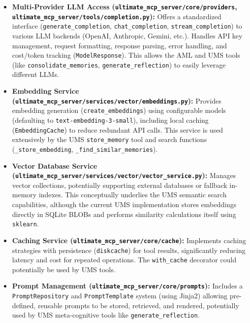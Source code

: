 \documentclass[12pt,a4paper]{article}
\newcommand{\code}[1]{\nolinkurl{#1}}
\begin{document}
\begin{itemize}
    \item \textbf{Multi-Provider LLM Access (\code{ultimate\_mcp\_server/core/providers}, \code{ultimate\_mcp\_server/tools/completion.py}):} Offers a standardized interface (\code{generate\_completion}, \code{chat\_completion}, \code{stream\_completion}) to various LLM backends (OpenAI, Anthropic, Gemini, etc.). Handles API key management, request formatting, response parsing, error handling, and cost/token tracking (\code{ModelResponse}). This allows the AML and UMS tools (like \code{consolidate\_memories}, \code{generate\_reflection}) to easily leverage different LLMs.

    \item \textbf{Embedding Service (\code{ultimate\_mcp\_server/services/vector/embeddings.py}):} Provides embedding generation (\code{create\_embeddings}) using configurable models (defaulting to \code{text-embedding-3-small}), including local caching (\code{EmbeddingCache}) to reduce redundant API calls. This service is used extensively by the UMS \code{store\_memory} tool and search functions (\code{\_store\_embedding}, \code{\_find\_similar\_memories}).

    \item \textbf{Vector Database Service (\code{ultimate\_mcp\_server/services/vector/vector\_service.py}):} Manages vector collections, potentially supporting external databases or fallback in-memory indexes. This conceptually underlies the UMS semantic search capabilities, although the current UMS implementation stores embeddings directly in SQLite BLOBs and performs similarity calculations itself using \code{sklearn}.

    \item \textbf{Caching Service (\code{ultimate\_mcp\_server/core/cache}):} Implements caching strategies with persistence (\code{diskcache}) for tool results, significantly reducing latency and cost for repeated operations. The \code{with\_cache} decorator could potentially be used by UMS tools.

    \item \textbf{Prompt Management (\code{ultimate\_mcp\_server/core/prompts}):} Includes a \code{PromptRepository} and \code{PromptTemplate} system (using Jinja2) allowing pre-defined, reusable prompts to be stored, retrieved, and rendered, potentially used by UMS meta-cognitive tools like \code{generate\_reflection}.
\end{itemize}
\end{document}
